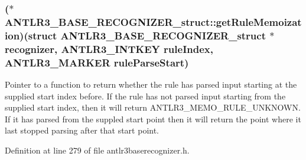 \hypertarget{struct_a_n_t_l_r3___b_a_s_e___r_e_c_o_g_n_i_z_e_r__struct_a681d3122d2203351989f1cfd482f3c8d}{
\subsubsection[{get\-Rule\-Memoization}]{($\ast$ A\-N\-T\-L\-R3\-\_\-\-B\-A\-S\-E\-\_\-\-R\-E\-C\-O\-G\-N\-I\-Z\-E\-R\-\_\-struct\-::get\-Rule\-Memoization)(struct {\bf A\-N\-T\-L\-R3\-\_\-\-B\-A\-S\-E\-\_\-\-R\-E\-C\-O\-G\-N\-I\-Z\-E\-R\-\_\-struct} $\ast${\bf recognizer}, {\bf A\-N\-T\-L\-R3\-\_\-\-I\-N\-T\-K\-E\-Y} rule\-Index, {\bf A\-N\-T\-L\-R3\-\_\-\-M\-A\-R\-K\-E\-R} rule\-Parse\-Start)}}\label{struct_a_n_t_l_r3___b_a_s_e___r_e_c_o_g_n_i_z_e_r__struct_a681d3122d2203351989f1cfd482f3c8d}
Pointer to a function to return whether the rule has parsed input starting at the supplied start index before. If the rule has not parsed input starting from the supplied start index, then it will return A\-N\-T\-L\-R3\-\_\-\-M\-E\-M\-O\-\_\-\-R\-U\-L\-E\-\_\-\-U\-N\-K\-N\-O\-W\-N. If it has parsed from the suppled start point then it will return the point where it last stopped parsing after that start point. 

Definition at line 279 of file antlr3baserecognizer.\-h.

